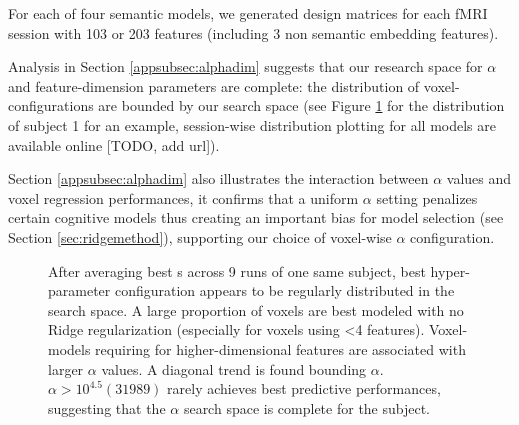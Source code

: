 For each of four semantic models, we generated design matrices for each fMRI session with 103 or 203 features (including 3 non semantic embedding features). 

Analysis in Section \ref{appsubsec:alphadim} suggests that our research space for \(\alpha\) and feature-dimension parameters are complete: the distribution of voxel-configurations are bounded by our search space (see Figure \ref{fig:MIX_HeatmapAlphaDimS1R0} for the  distribution of subject 1 for an example, session-wise distribution plotting for all models are available online [TODO, add url]). 

Section \ref{appsubsec:alphadim} also illustrates the interaction between \(\alpha\) values and voxel regression performances, it confirms that a uniform \(\alpha\) setting penalizes certain cognitive models thus creating an important bias for model selection (see Section \ref{sec:ridgemethod}), supporting our choice of voxel-wise \(\alpha\) configuration.

\begin{figure}
\centering
            \caption[Subject Best Hyper-parameter Configuration Voxel-Count Heat-map]{After averaging  best s across 9 runs of one same subject, best hyper-parameter configuration appears to be regularly distributed in the search space. A large proportion of voxels are best modeled with no Ridge regularization (especially for voxels using <4 features). Voxel-models requiring for higher-dimensional features are associated with larger \(\alpha\) values. A diagonal trend is found bounding  \(\alpha\). \(\alpha > 10^{4.5} (31989)\) rarely achieves best predictive performances, suggesting that the \(\alpha\) search space is complete for the subject.} 
            \label{fig:MIX_HeatmapAlphaDimS1R0}
\end{figure}

